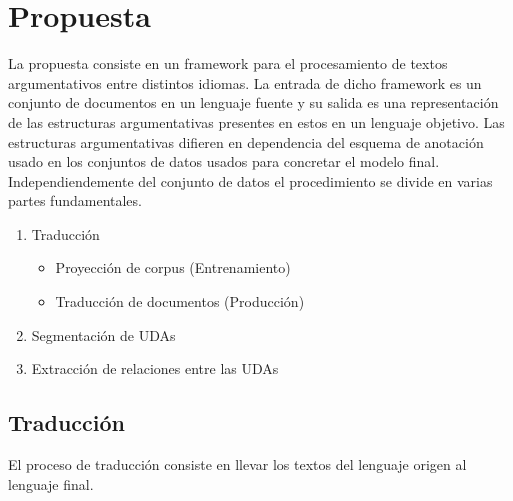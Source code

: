 \chapter{Propuesta}\label{chapter:proposal}





La propuesta consiste en un framework para el procesamiento de textos argumentativos entre distintos idiomas.
La entrada de dicho framework es un conjunto de documentos en un lenguaje fuente y su salida es una representación
de las estructuras argumentativas presentes en estos en un lenguaje objetivo. Las estructuras argumentativas 
difieren en dependencia del esquema de anotación usado en los conjuntos de datos usados para concretar el modelo
final. Independiendemente del conjunto de datos el procedimiento se divide en varias partes fundamentales.

\begin{enumerate}
    \item Traducción
    \begin{itemize}
        \item Proyección de corpus (Entrenamiento)
        \item Traducción de documentos (Producción)
    \end{itemize}
    \item Segmentación de UDAs
    \item Extracción de relaciones entre las UDAs
\end{enumerate}

\section{Traducción}

El proceso de traducción consiste en llevar los textos del lenguaje origen al lenguaje final.


